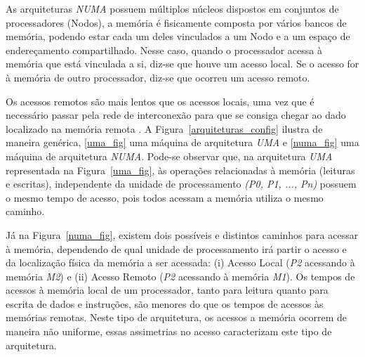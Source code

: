 \documentclass[ti]{texufpel}
\begin{document}
As arquiteturas \emph{NUMA} possuem múltiplos núcleos dispostos em conjuntos de processadores (Nodos), a memória é fisicamente composta por vários bancos de memória, podendo estar cada um deles vinculados a um Nodo e a um espaço de endereçamento compartilhado. Nesse caso, quando o processador acessa à memória que está vinculada a si, diz-se que houve um acesso local. Se o acesso for à memória de outro processador, diz-se que ocorreu um acesso remoto.

Os acessos remotos são mais lentos que os acessos locais, uma vez que é necessário passar pela rede de interconexão para que se consiga chegar ao dado localizado na memória remota \cite{rodolfo14}. A Figura~\ref{arquiteturas_config} ilustra de maneira genérica, \ref{uma_fig} uma máquina de arquitetura \emph{UMA} e \ref{numa_fig} uma máquina de arquitetura \emph{NUMA}. Pode-se observar que, na arquitetura \emph{UMA} representada na Figura~\ref{uma_fig}, às operações relacionadas à memória (leituras e escritas), independente da unidade de processamento \emph{(P0, P1, ..., Pn)} possuem o mesmo tempo de acesso, pois todos acessam a memória utiliza o mesmo caminho.

Já na Figura~\ref{numa_fig}, existem dois possíveis e distintos caminhos para acessar à memória, dependendo de qual unidade de processamento irá partir o acesso e da localização física da memória a ser acessada: (i) Acesso Local (\emph{P2} acessando à memória \emph{M2}) e (ii) Acesso Remoto (\emph{P2} acessando à memória \emph{M1}). Os tempos de acessos à memória local de um processador, tanto para leitura quanto para escrita de dados e instruções, são menores do que os tempos de acessos às memórias remotas. Neste tipo de arquitetura, os acessos a memória ocorrem de maneira não uniforme, essas assimetrias no acesso caracterizam este tipo de arquitetura.
\end{document}
